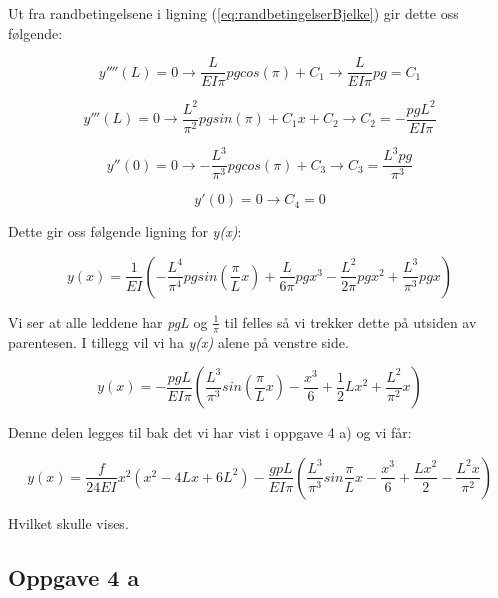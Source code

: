 Ut fra randbetingelsene i ligning (\ref{eq:randbetingelserBjelke}) gir dette oss følgende:

\begin{equation}
y''''(L)=0 \rightarrow \frac{L}{EI\pi}pgcos(\pi)+C_1 \rightarrow \frac{L}{EI\pi}pg=C_1
\end{equation}

\begin{equation}
y'''(L)=0 \rightarrow \frac{L^2}{\pi^2}pgsin(\pi)+C_1x+C_2 \rightarrow C_2=-\frac{pgL^2}{EI\pi}
\end{equation}

\begin{equation}
y''(0)=0 \rightarrow -\frac{L^3}{\pi^3}pgcos(\pi)+C_3 \rightarrow C_3=\frac{L^3pg}{\pi^3}
\end{equation}

\begin{equation}
y'(0)=0 \rightarrow C_4=0
\end{equation}

Dette gir oss følgende ligning for \textit{y(x)}:

\begin{equation}
y(x)=\frac{1}{EI}(-\frac{L^4}{\pi^4}pgsin(\frac{\pi}{L}x)+\frac{L}{6\pi}pgx^3-\frac{L^2}{2\pi}pgx^2+\frac{L^3}{\pi^3}pgx)
\end{equation}

Vi ser at alle leddene har \textit{pgL} og $\frac{1}{\pi}$ til felles så vi trekker dette på utsiden av parentesen. I tillegg vil vi ha \textit{y(x)} alene på venstre side. 

\begin{equation}
y(x)=-\frac{pgL}{EI\pi}(\frac{L^3}{\pi^3}sin(\frac{\pi}{L}x)-\frac{x^3}{6}+\frac{1}{2}Lx^2+\frac{L^2}{\pi^2}x)
\end{equation}

Denne delen legges til bak det vi har vist i oppgave 4 a) og vi får:

\begin{equation}
y(x) = \frac{f}{24EI}x^{2}(x^2-4Lx+6L^2)-\frac{gpL}{EI\pi}(\frac{L^3}{\pi^3}sin\frac{\pi}{L}x-\frac{x^3}{6}+\frac{Lx^2}{2}-\frac{L^2x}{\pi^2})
\end{equation}

Hvilket skulle vises.

\subsection{Oppgave 4 a}\label{sec:oppg4}

